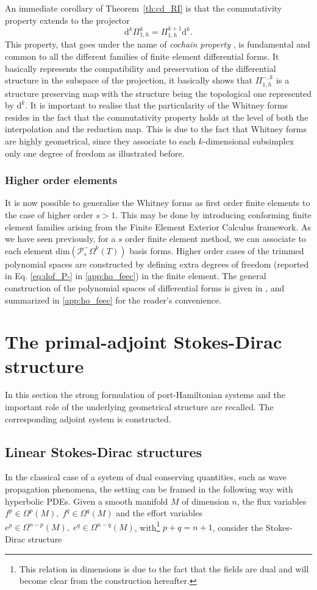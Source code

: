 \documentclass{elsarticle}
\renewcommand\d{\ensuremath{\mathrm{d}}}
\begin{document}
An immediate corollary of Theorem~\ref{th:cd_RI} is that the commutativity property extends to the projector 
\begin{equation*}
\d^k \Pi_{1, h}^k = \Pi_{1, h}^{k+1}\d^k.    
\end{equation*}
This property, that goes under the name of {\it cochain property} \cite{arnold2018finite}, is fundamental and common to all the different families of finite element differential forms. It basically represents the compatibility and preservation of the differential structure in the subspace of the projection, it basically shows that $\Pi_{1, h}^{-, k}$ is a structure preserving map with the structure being the topological one represented by $\d^k$. It is important to realise that the particularity of the Whitney forms resides in the fact that the commutativity property holds at the level of both the interpolation and the reduction map. This is due to the fact that Whitney forms are highly geometrical, since they associate to each $k$-dimensional subsimplex only one degree of freedom as illustrated before.

\subsubsection{Higher order elements}
It is now possible to generalise the Whitney forms as first order finite elements to the case of higher order $s>1$. This may be done by introducing  conforming finite element families arising from the Finite Element Exterior Calculus framework. As we have seen previously, for a $s$ order finite element method, we can associate to each element $\mathrm{dim}( \mathcal{P}^-_s\Omega^k(T))$ basis forms. Higher order cases of the trimmed polynomial spaces are constructed by defining extra degrees of freedom (reported in Eq. \eqref{eq:dof_P-} in \ref{app:ho_feec}) in the finite element. The general construction of the
polynomial spaces of differential forms is given in \cite{arnold2006acta}, and summarized in \ref{app:ho_feec} for the reader's convenience. 

\section{The primal-adjoint Stokes-Dirac structure}\label{sec:pradj_SDS}
In this section the strong formulation of port-Hamiltonian systems and the important role of the underlying geometrical structure are recalled. The corresponding adjoint system is constructed.

\subsection{Linear Stokes-Dirac structures}
In the classical case of a system of dual conserving quantities, such as wave propagation phenomena, the setting can be framed in the following way with hyperbolic PDEs. Given a smooth manifold $M$ of dimension $n$, the flux variables ${f}^p \in \Omega^p(M), \; {f}^q \in \Omega^q(M)$ and the effort variables ${e}^p \in \Omega^{n-p}(M), \; {e}^q \in \Omega^{n-q}(M)$, with\footnote{This relation in dimensions is due to the fact that the fields are dual and will become clear from the construction hereafter.} $p+q=n+1$, consider the Stokes-Dirac structure
\end{document}
